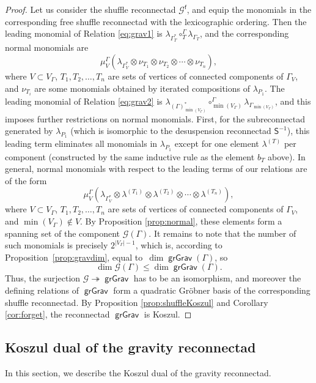 \documentclass[11pt]{article}
\theoremstyle{definition}
\numberwithin{equation}{section}
\newcommand\calG{\mathcal{G}}
\DeclareMathOperator{\grGrav}{\mathsf{grGrav}}
\begin{document}
\begin{proof}
Let us consider the shuffle reconnectad $\calG^{\mathsf{f}}$, and equip the monomials in the corresponding free shuffle reconnectad with the lexicographic ordering. Then the leading monomial of Relation \eqref{eq:grav1} is $\lambda_{\Gamma^*_{T}}\circ_T^{\Gamma} \lambda_{\Gamma_{T}}$, and the corresponding normal monomials are
 \[
\mu_V^\Gamma(\lambda_{\Gamma^*_V}\otimes\nu_{T_1}\otimes\nu_{T_2}\otimes\cdots\otimes\nu_{T_n}),
 \]
where $V\subset V_\Gamma$, $T_1,T_2,\ldots,T_n$ are sets of vertices of connected components of $\Gamma_V$, and $\nu_{T_i}$ are some monomials obtained by iterated compositions of $\lambda_{P_1}$. The leading monomial of Relation \eqref{eq:grav2} is $\lambda_{(\Gamma)^*_{\min(V_\Gamma)}} \circ_{\min(V_\Gamma)}^{\Gamma} \lambda_{\Gamma_{\min(V_\Gamma)}}$, and this imposes further restrictions on normal monomials. First, for the subreconnectad generated by $\lambda_{P_1}$ (which is isomorphic to the desuspension reconnectad $\mathsf{S}^{-1}$), this leading term eliminates all monomials in $\lambda_{P_1}$ except for one element $\lambda^{(T)}$ per component (constructed by the same inductive rule as the element $b_T$ above). In general, normal monomials with respect to the leading terms of our relations are of the form
 \[
\mu_V^\Gamma(\lambda_{\Gamma^*_V}\otimes\lambda^{(T_1)}\otimes\lambda^{(T_2)}\otimes\cdots\otimes\lambda^{(T_n)}),
 \]
where $V\subset V_\Gamma$, $T_1,T_2,\ldots,T_n$ are sets of vertices of connected components of $\Gamma_V$, and $\min(V_\Gamma)\notin V$. By Proposition \ref{prop:normal}, these elements form a spanning set of the component $\calG(\Gamma)$. It remains to note that the number of such monomials is precisely $2^{|V_\Gamma|-1}$, which is, according to Proposition~\ref{prop:gravdim}, equal to~$\dim\grGrav(\Gamma)$, so 
 \[
\dim\calG(\Gamma)\le \dim\grGrav(\Gamma).
 \] 
Thus, the surjection $\calG\twoheadrightarrow\grGrav$ has to be an isomorphism, and moreover the defining relations of $\grGrav$ form a quadratic Gr\"obner basis of the corresponding shuffle reconnectad. By Proposition \ref{prop:shuffleKoszul} and Corollary \ref{cor:forget}, the reconnectad $\grGrav$ is Koszul.
\end{proof}

\subsection{Koszul dual of the gravity reconnectad}

In this section, we describe the Koszul dual of the gravity reconnectad. 
\end{document}
